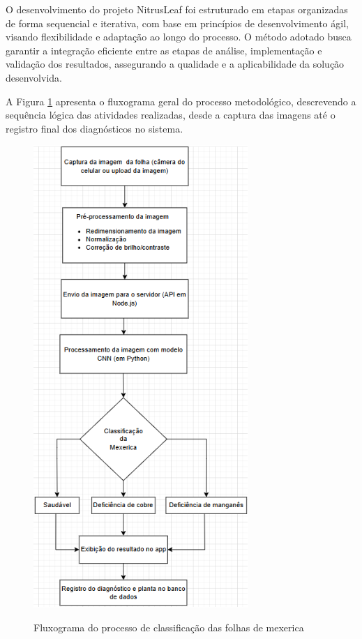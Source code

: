 O desenvolvimento do projeto NitrusLeaf foi estruturado em etapas organizadas de forma sequencial e iterativa, com base em princípios de desenvolvimento ágil, visando flexibilidade e adaptação ao longo do processo. O método adotado busca garantir a integração eficiente entre as etapas de análise, implementação e validação dos resultados, assegurando a qualidade e a aplicabilidade da solução desenvolvida.

A Figura \ref{fig:fluxograma} apresenta o fluxograma geral do processo metodológico, descrevendo a sequência lógica das atividades realizadas, desde a captura das imagens até o registro final dos diagnósticos no sistema.

\begin{figure}[H]
    \centering
    \caption{Fluxograma do processo de classificação das folhas de mexerica}
    \includegraphics[width=0.6\linewidth]{Illustrations/fluxograma.png}
    \label{fig:fluxograma}
\end{figure}

